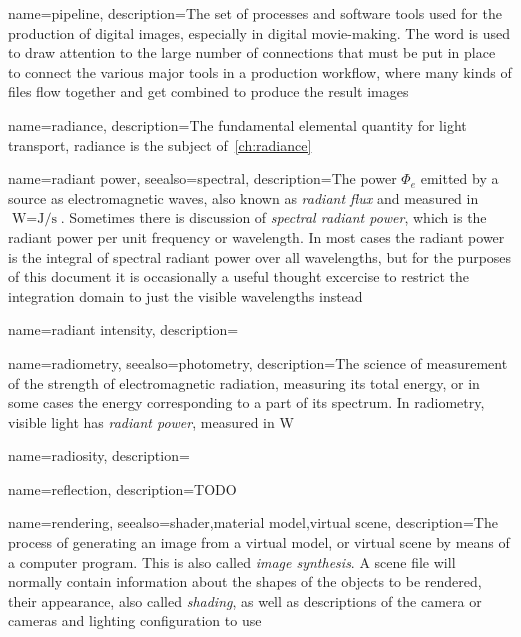 {
	name={pipeline},
	description={The set of processes and software tools used for the production of 
		digital images, especially in digital movie-making. The word is used to draw
		attention to the large number of connections that must be put in place to 
		connect the various major tools in a production workflow, where many kinds
		of files flow together and get combined to produce the result images}
}

{
	name=radiance,
	description={The fundamental elemental quantity for light transport, radiance
		is the subject of~\cref{ch:radiance}}
}

{
	name={radiant power},
	seealso={spectral},
	description={The power $\Phi_e$ emitted by a source as electromagnetic waves,
		also known as \textsl{radiant flux} and measured in 
		$\unit{\watt} = \unit{\joule\per\second}$. 
		Sometimes there is discussion of \textsl{spectral radiant power},
		which is the radiant power per unit frequency or wavelength.
		In most cases the radiant power is the integral of spectral radiant power
		over all wavelengths, but for the purposes of this document it is occasionally 
		a useful thought excercise to restrict the integration domain to just the
		visible wavelengths instead}
}

{
	name={radiant intensity},
	description=\nopostdesc
}

{
	name={radiometry},
	seealso={photometry},
	description={The science of measurement of the strength of electromagnetic radiation,
		measuring its total energy, or in some cases the energy corresponding to a part of
		its spectrum. In radiometry, visible light has \textsl{radiant power},
		measured in \unit{\watt}}
}

{
	name={radiosity},
	description=\nopostdesc
}

{
	name={reflection},
	description={TODO}
}

{
	name={rendering},
	seealso={shader,material model,virtual scene},
	description={The process of generating an image from a virtual model, or virtual scene by 
		means of a computer program. This is also called \textsl{image synthesis}. A scene file
		will normally contain information about the shapes of the objects to be rendered, their
		appearance, also called \textsl{shading}, as well as descriptions of the camera or cameras and lighting configuration
		to use}
}

